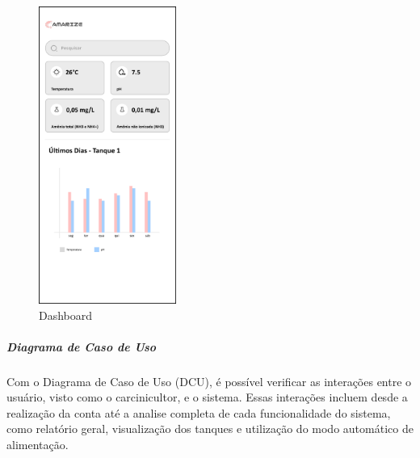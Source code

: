 \begin{figure}[!htb]
\centering
{}
\caption{Dashboard}%
\label{fig:tela-dashboard}
\includegraphics[width = 0.4\textwidth]{Imagens/DASHBOARD.png}
\end{figure}

\newpage

\subparagraph*{\textbf{Diagrama de Caso de Uso}}

Com o Diagrama de Caso de Uso (DCU), é possível verificar as interações entre o usuário, visto como o carcinicultor, e o sistema. Essas interações incluem desde a realização da conta até a analise completa de cada funcionalidade do sistema, como relatório geral, visualização dos tanques e utilização do modo automático de alimentação.

